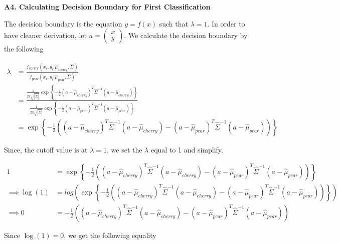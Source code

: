 \documentclass[]{article}
\begin{document}
\newpage

\textbf{A4. Calculating Decision Boundary for First Classification}

The decision boundary is the equation \(y = f(x)\) such that
\(\lambda=1\). In order to have cleaner derivation, let
\(a = \left( \begin{matrix}x \\y \end{matrix}\right)\). We calculate the
decision boundary by the following

\begin{align*}
\lambda &= \frac{f_{\text{cherry}}(x_i,y_i|\hat{\mu}_{\text{cherry}}, \hat{\Sigma})}{f_{\text{pear}} (x_i,y_i|\hat{\mu}_{\text{pear}}, \hat{\Sigma})} \\
&= \frac{\frac{1}{2\pi\sqrt{|\hat{\Sigma}_{\text{}}|}} \exp\left\{-\frac12(a - \hat{\mu}_{cherry})^T \hat{\Sigma}_{\text{}}^{-1} (a - \hat{\mu}_{cherry}) \right \}}
{\frac{1}{2\pi\sqrt{|\hat{\Sigma}_{\text{}}|}} \exp\left\{-\frac12 (a - \hat{\mu}_{pear})^T \hat{\Sigma}_{\text{}}^{-1} (a - \hat{\mu}_{pear}) \right \}} \\
&= \exp \left\{ 
-\frac12 
\left(
(a - \hat{\mu}_{cherry})^T 
\hat{\Sigma}_{\text{}}^{-1}
(a - \hat{\mu}_{cherry}) - 
(a - \hat{\mu}_{pear})^T 
\hat{\Sigma}_{\text{}}^{-1} 
(a - \hat{\mu}_{pear})
\right)
\right\} 
\end{align*}

Since, the cutoff value is at \(\lambda=1\), we set the \(\lambda\)
equal to 1 and simplify.

\begin{align*}
1 &= \exp \left\{ 
-\frac12 
\left(
(a - \hat{\mu}_{cherry})^T 
\hat{\Sigma}_{\text{}}^{-1}
(a - \hat{\mu}_{cherry}) - 
(a - \hat{\mu}_{pear})^T 
\hat{\Sigma}_{\text{}}^{-1} 
(a - \hat{\mu}_{pear})
\right)
\right\} 
\\ 
\implies \log (1) 
&= log( \exp \left\{ 
-\frac12 
\left(
(a - \hat{\mu}_{cherry})^T 
\hat{\Sigma}_{\text{}}^{-1}
(a - \hat{\mu}_{cherry}) - 
(a - \hat{\mu}_{pear})^T 
\hat{\Sigma}_{\text{}}^{-1} 
(a - \hat{\mu}_{pear})
\right)
\right\}) 
\\
\implies 0
&=-\frac12 
\left(
(a - \hat{\mu}_{cherry})^T 
\hat{\Sigma}_{\text{}}^{-1}
(a - \hat{\mu}_{cherry}) - 
(a - \hat{\mu}_{pear})^T 
\hat{\Sigma}_{\text{}}^{-1} 
(a - \hat{\mu}_{pear})
\right) 
\end{align*}

Since \(\log (1) = 0\), we get the following equality
\end{document}

